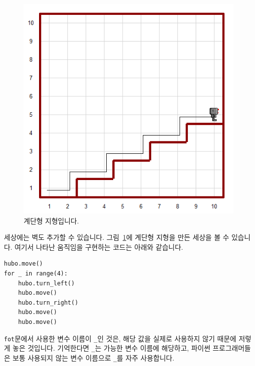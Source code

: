 \documentclass[../main.tex]{subfiles}
\begin{document}
\begin{figure}[htbp]
\centering
\includegraphics[width=0.5\linewidth]{"./lectures/lecture4_hubostairs"}
\caption{계단형 지형입니다.}\label{fig:lecture4:hubostairs}
\end{figure}

세상에는 벽도 추가할 수 있습니다.
그림~\ref{fig:lecture4:hubostairs}에 계단형 지형을 만든 세상을 볼 수 있습니다.
여기서 나타난 움직임을 구현하는 코드는 아래와 같습니다.
\begin{verbatim}
hubo.move()
for _ in range(4):
    hubo.turn_left()
    hubo.move()
    hubo.turn_right()
    hubo.move()
    hubo.move()
\end{verbatim}
\verb/fot/문에서 사용한 변수 이름이 \verb/_/인 것은, 해당 값을 실제로 사용하지 않기 때문에 저렇게 놓은 것입니다.
기억한다면 \verb/_/는 가능한 변수 이름에 해당하고, 파이썬 프로그래머들은 보통 사용되지 않는 변수 이름으로 \verb/_/를 자주 사용합니다.
\end{document}
